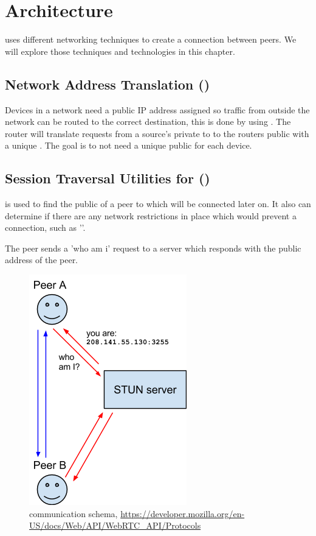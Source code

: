 \section{Architecture}
 uses different networking techniques to create a connection between peers. We will explore those techniques and technologies in this chapter.

\subsection{Network Address Translation ()}
Devices in a network need a public IP address assigned so traffic from outside the network can be routed to the correct destination, this is done by using . The router will translate requests from a source's private  to to the routers public  with a unique . The goal is to not need a unique public  for each device.

\clearpage
\subsection{Session Traversal Utilities for  ()}
 is used to find the public  of a peer to which will be connected later on. It also can determine if there are any network restrictions in place which would prevent a connection, such as ''.

The peer sends a 'who am i' request to a  server which responds with the public address of the peer.

\begin{figure}[H]
	\includegraphics[scale=0.5]{images/webrtc-stun.png}
	\centering
	\caption{ communication schema, \url{https://developer.mozilla.org/en-US/docs/Web/API/WebRTC_API/Protocols}}
	\label{fig:STUN}
\end{figure}

